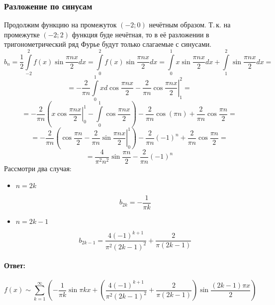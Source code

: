\documentclass[12pt]{scrartcl}
\begin{document}
\subsubsection{Разложение по синусам}
Продолжим функцию на промежуток $\left(-2;0\right)$ нечётным образом.
Т.\,к. на промежутке $\left(-2;2\right)$ функция буде нечётная, то в её разложении в тригонометрический ряд Фурье будут только слагаемые с синусами.
$$b_n = \frac12\int\limits_{-2}^2 f\left(x\right) \sin\frac{\pi n x}{2}dx = \int\limits_0^2 f\left(x\right) \sin\frac{\pi n x}{2} dx = 
\int\limits_0^1 x\sin\frac{\pi n x}{2} dx + \int\limits_1^2 \sin\frac{\pi n x}{2} dx=$$
$$
= -\frac{2}{\pi n}\int\limits_0^1 x d\cos\frac{\pi n x}{2} - \left.\frac{2}{\pi n}\cos\frac{\pi n x}{2}\right|_1^2=$$
$$= 
-\frac{2}{\pi n}\left(\left.x\cos\frac{\pi n x}{2}\right|_0^1 - \int\limits_0^1\cos\frac{\pi n x}{2}\right) - \frac{2}{\pi n}\cos{\left(\pi n\right)} + \frac{2}{\pi n}\cos\frac{\pi n}{2}
=$$
$$=
-\frac{2}{\pi n}\left(\cos\frac{\pi n}{2} - \left.\frac{2}{\pi n}\sin\frac{\pi n x}{2}\right|_0^1\right) - \frac{2}{\pi n}\left(-1\right)^n + \frac{2}{\pi n}\cos\frac{\pi n}{2}=
$$
$$=
\frac{4}{\pi^2 n^2}\sin\frac{\pi n}{2} - \frac{2}{\pi n}\left(-1\right)^n
$$
Рассмотри два случая:
\begin{itemize}
\item $n = 2k$

$$b_{2k} = -\frac{1}{\pi k}$$
\item $n = 2k - 1$

$$b_{2k - 1} = \frac{4\left(-1\right)^{k+1}}{\pi^2 \left(2k - 1\right)^2} + \frac{2}{\pi \left(2k - 1\right)}$$
\end{itemize}
\paragraph*{Ответ:}
$$f\left(x\right) \sim \sum\limits_{k = 1}^\infty{\left(-\frac{1}{\pi k}\sin{\pi k x} + \left(\frac{4\left(-1\right)^{k+1}}{\pi^2 \left(2k - 1\right)^2} + \frac{2}{\pi \left(2k - 1\right)}\right)\sin\frac{\left(2k - 1\right)\pi x}{2}\right)}$$
\end{document}
